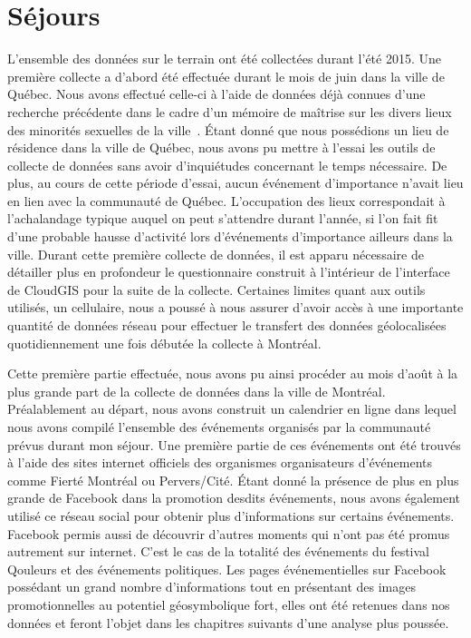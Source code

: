 \section{Séjours}
\label{sec:s_jours}
L'ensemble des données sur le terrain ont été collectées durant l'été 2015. 
Une première collecte a d'abord été effectuée durant le mois de juin dans la ville de Québec. 
Nous avons effectué celle-ci à l'aide de données déjà connues d'une recherche précédente dans le cadre d'un mémoire de maîtrise sur les divers lieux des minorités sexuelles de la ville~\citep{Vachon2014}. 
Étant donné que nous possédions un lieu de résidence dans la ville de Québec, nous avons pu mettre à l'essai les outils de collecte de données sans avoir d'inquiétudes concernant le temps nécessaire. 
De plus, au cours de cette période d'essai, aucun événement d'importance n'avait lieu en lien avec la communauté \lgbt{} de Québec. 
L'occupation des lieux correspondait à l'achalandage typique auquel on peut s'attendre durant l'année, si l'on fait fit d'une probable hausse d'activité lors d'événements d'importance ailleurs dans la ville. 
Durant cette première collecte de données, il est apparu nécessaire de détailler plus en profondeur le questionnaire construit à l'intérieur de l'interface de CloudGIS pour la suite de la collecte. 
Certaines limites quant aux outils utilisés, un cellulaire, nous a poussé à nous assurer d'avoir accès à une importante quantité de données réseau pour effectuer le transfert des données géolocalisées quotidiennement une fois débutée la collecte à Montréal.

Cette première partie effectuée, nous avons pu ainsi procéder au mois d'août à la plus grande part de la collecte de données dans la ville de Montréal.
Préalablement au départ, nous avons construit un calendrier en ligne dans lequel nous avons compilé l'ensemble des événements organisés par la communauté \lgbt{} prévus durant mon séjour. 
Une première partie de ces événements ont été trouvés à l'aide des sites internet officiels des organismes organisateurs d'événements comme Fierté Montréal ou Pervers/Cité. 
Étant donné la présence de plus en plus grande de Facebook dans la promotion desdits événements, nous avons également utilisé ce réseau social pour obtenir plus d'informations sur certains événements. 
Facebook permis aussi de découvrir d'autres moments qui n'ont pas été promus autrement sur  internet. 
C'est le cas de la totalité des événements du festival Qouleurs et des événements politiques. 
Les pages événementielles sur Facebook possédant un grand nombre d'informations tout en présentant des images promotionnelles au potentiel géosymbolique fort, elles ont été retenues dans nos données et feront l'objet dans les chapitres suivants d'une analyse plus poussée.

